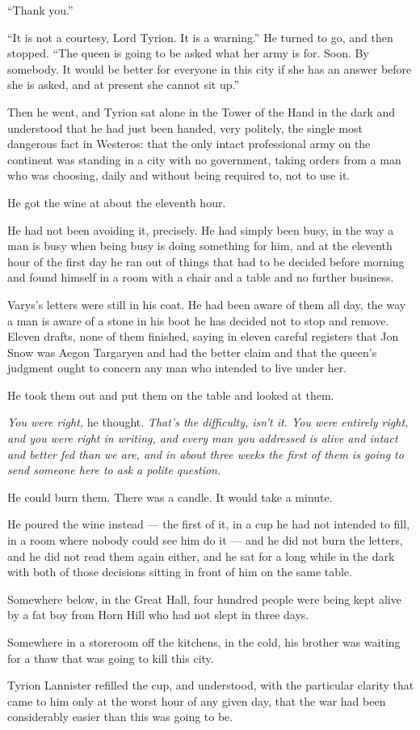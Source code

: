 “Thank you.”

“It is not a courtesy, Lord Tyrion. It is a warning.” He turned to go, and then stopped. “The queen is going to be asked what her army is for. Soon. By somebody. It would be better for everyone in this city if she has an answer before she is asked, and at present she cannot sit up.”

Then he went, and Tyrion sat alone in the Tower of the Hand in the dark and understood that he had just been handed, very politely, the single most dangerous fact in Westeros: that the only intact professional army on the continent was standing in a city with no government, taking orders from a man who was choosing, daily and without being required to, not to use it.

\sceneBreak

He got the wine at about the eleventh hour.

He had not been avoiding it, precisely. He had simply been busy, in the way a man is busy when being busy is doing something for him, and at the eleventh hour of the first day he ran out of things that had to be decided before morning and found himself in a room with a chair and a table and no further business.

Varys’s letters were still in his coat. He had been aware of them all day, the way a man is aware of a stone in his boot he has decided not to stop and remove. Eleven drafts, none of them finished, saying in eleven careful registers that Jon Snow was Aegon Targaryen and had the better claim and that the queen’s judgment ought to concern any man who intended to live under her.

He took them out and put them on the table and looked at them.

\textit{You were right,} he thought. \textit{That’s the difficulty, isn’t it. You were entirely right, and you were right in writing, and every man you addressed is alive and intact and better fed than we are, and in about three weeks the first of them is going to send someone here to ask a polite question.}

He could burn them. There was a candle. It would take a minute.

He poured the wine instead — the first of it, in a cup he had not intended to fill, in a room where nobody could see him do it — and he did not burn the letters, and he did not read them again either, and he sat for a long while in the dark with both of those decisions sitting in front of him on the same table.

Somewhere below, in the Great Hall, four hundred people were being kept alive by a fat boy from Horn Hill who had not slept in three days.

Somewhere in a storeroom off the kitchens, in the cold, his brother was waiting for a thaw that was going to kill this city.

Tyrion Lannister refilled the cup, and understood, with the particular clarity that came to him only at the worst hour of any given day, that the war had been considerably easier than this was going to be.